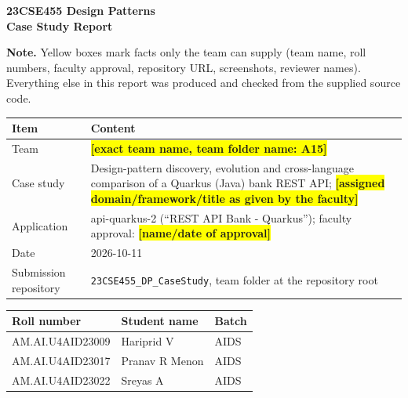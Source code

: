 \documentclass[11pt,a4paper]{article}
\newcommand{\ph}[1]{\colorbox{yellow}{\textbf{[#1]}}}
\begin{document}
\begin{center}{\LARGE\bfseries 23CSE455 Design Patterns\\[2pt] Case Study Report}\end{center}
\textbf{Note.} Yellow boxes mark facts only the team can supply (team name, roll numbers, faculty approval, repository URL, screenshots, reviewer names). Everything else in this report was produced and checked from the supplied source code.
\medskip
{\small
\begin{center}\begin{tabular}{@{}p{3.3cm}p{12.4cm}@{}}
\toprule \textbf{Item} & \textbf{Content} \\ \midrule
Team & \ph{exact team name, team folder name: A15} \\
Case study & Design-pattern discovery, evolution and cross-language comparison of a Quarkus (Java) bank REST API; \ph{assigned domain/framework/title as given by the faculty} \\
Application & api-quarkus-2 (``REST API Bank - Quarkus''); faculty approval: \ph{name/date of approval} \\
Date & 2026-10-11 \\
Submission repository & \texttt{23CSE455\_\allowbreak{}DP\_\allowbreak{}CaseStudy}, team folder at the repository root \\
\bottomrule\end{tabular}\end{center}
}
{\small
\begin{center}\begin{tabular}{@{}p{4cm}p{6cm}p{5cm}@{}}
\toprule \textbf{Roll number} & \textbf{Student name} & \textbf{Batch} \\ \midrule
AM.AI.U4AID23009 & Hariprid V & AIDS \\
AM.AI.U4AID23017 & Pranav R Menon & AIDS \\
AM.AI.U4AID23022 & Sreyas A & AIDS \\
\bottomrule\end{tabular}\end{center}
}
\tableofcontents\newpage
\end{document}
